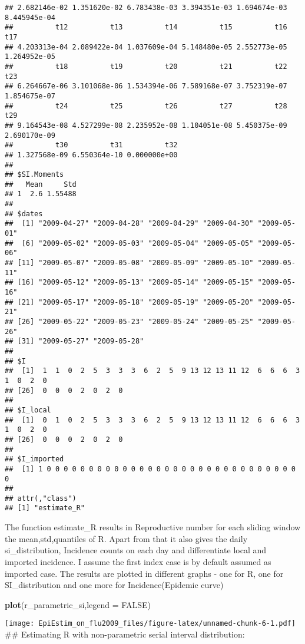 \documentclass[
]{article}
\newenvironment{Shaded}{\begin{snugshade}}{\end{snugshade}}
\newcommand{\AttributeTok}[1]{\textcolor[rgb]{0.13,0.29,0.53}{#1}}
\newcommand{\ConstantTok}[1]{\textcolor[rgb]{0.56,0.35,0.01}{#1}}
\newcommand{\FunctionTok}[1]{\textcolor[rgb]{0.13,0.29,0.53}{\textbf{#1}}}
\newcommand{\NormalTok}[1]{#1}
\begin{document}
\begin{verbatim}
## 2.682146e-02 1.351620e-02 6.783438e-03 3.394351e-03 1.694674e-03 8.445945e-04 
##          t12          t13          t14          t15          t16          t17 
## 4.203313e-04 2.089422e-04 1.037609e-04 5.148480e-05 2.552773e-05 1.264952e-05 
##          t18          t19          t20          t21          t22          t23 
## 6.264667e-06 3.101068e-06 1.534394e-06 7.589168e-07 3.752319e-07 1.854675e-07 
##          t24          t25          t26          t27          t28          t29 
## 9.164543e-08 4.527299e-08 2.235952e-08 1.104051e-08 5.450375e-09 2.690170e-09 
##          t30          t31          t32 
## 1.327568e-09 6.550364e-10 0.000000e+00 
## 
## $SI.Moments
##   Mean     Std
## 1  2.6 1.55488
## 
## $dates
##  [1] "2009-04-27" "2009-04-28" "2009-04-29" "2009-04-30" "2009-05-01"
##  [6] "2009-05-02" "2009-05-03" "2009-05-04" "2009-05-05" "2009-05-06"
## [11] "2009-05-07" "2009-05-08" "2009-05-09" "2009-05-10" "2009-05-11"
## [16] "2009-05-12" "2009-05-13" "2009-05-14" "2009-05-15" "2009-05-16"
## [21] "2009-05-17" "2009-05-18" "2009-05-19" "2009-05-20" "2009-05-21"
## [26] "2009-05-22" "2009-05-23" "2009-05-24" "2009-05-25" "2009-05-26"
## [31] "2009-05-27" "2009-05-28"
## 
## $I
##  [1]  1  1  0  2  5  3  3  3  6  2  5  9 13 12 13 11 12  6  6  6  3  1  0  2  0
## [26]  0  0  0  2  0  2  0
## 
## $I_local
##  [1]  0  1  0  2  5  3  3  3  6  2  5  9 13 12 13 11 12  6  6  6  3  1  0  2  0
## [26]  0  0  0  2  0  2  0
## 
## $I_imported
##  [1] 1 0 0 0 0 0 0 0 0 0 0 0 0 0 0 0 0 0 0 0 0 0 0 0 0 0 0 0 0 0 0 0
## 
## attr(,"class")
## [1] "estimate_R"
\end{verbatim}

The function estimate\_R results in Reproductive number for each sliding
window the mean,std,quantiles of R. Apart from that it also gives the
daily si\_distribution, Incidence counts on each day and differentiate
local and imported incidence. I assume the first index case is by
default assumed as imported case. The results are plotted in different
graphs - one for R, one for SI\_distribution and one more for
Incidence(Epidemic curve)

\begin{Shaded}
\begin{Highlighting}[]
\FunctionTok{plot}\NormalTok{(r\_parametric\_si,}\AttributeTok{legend =} \ConstantTok{FALSE}\NormalTok{)}
\end{Highlighting}
\end{Shaded}

\texttt{[image: EpiEstim\_on\_flu2009\_files/figure-latex/unnamed-chunk-6-1.pdf]}
\#\# Estimating R with non-parametric serial interval distribution:
\end{document}
